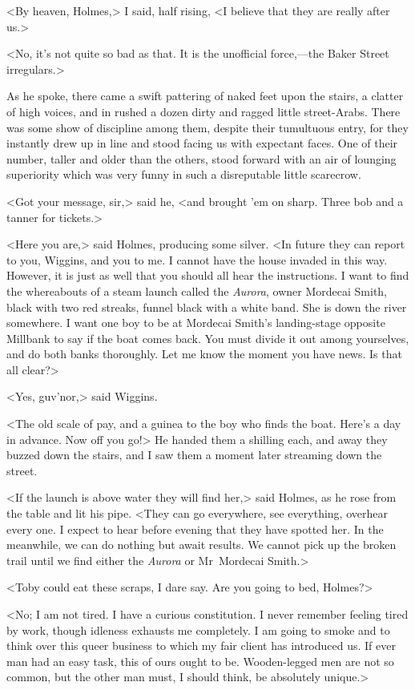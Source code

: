<By heaven, Holmes,> I said, half rising, <I believe that they are really after us.>

<No, it's not quite so bad as that. It is the unofficial force,—the Baker Street irregulars.>

As he spoke, there came a swift pattering of naked feet upon the stairs, a clatter of high voices, and in rushed a dozen dirty and ragged little street-Arabs. There was some show of discipline among them, despite their tumultuous entry, for they instantly drew up in line and stood facing us with expectant faces. One of their number, taller and older than the others, stood forward with an air of lounging superiority which was very funny in such a disreputable little scarecrow.

<Got your message, sir,> said he, <and brought 'em on sharp. Three bob and a tanner for tickets.>

<Here you are,> said Holmes, producing some silver. <In future they can report to you, Wiggins, and you to me. I cannot have the house invaded in this way. However, it is just as well that you should all hear the instructions. I want to find the whereabouts of a steam launch called the \textit{Aurora}, owner Mordecai Smith, black with two red streaks, funnel black with a white band. She is down the river somewhere. I want one boy to be at Mordecai Smith's landing-stage opposite Millbank to say if the boat comes back. You must divide it out among yourselves, and do both banks thoroughly. Let me know the moment you have news. Is that all clear?>

<Yes, guv'nor,> said Wiggins.

<The old scale of pay, and a guinea to the boy who finds the boat. Here's a day in advance. Now off you go!> He handed them a shilling each, and away they buzzed down the stairs, and I saw them a moment later streaming down the street.

<If the launch is above water they will find her,> said Holmes, as he rose from the table and lit his pipe. <They can go everywhere, see everything, overhear every one. I expect to hear before evening that they have spotted her. In the meanwhile, we can do nothing but await results. We cannot pick up the broken trail until we find either the \textit{Aurora} or Mr~Mordecai Smith.>

<Toby could eat these scraps, I dare say. Are you going to bed, Holmes?>

<No; I am not tired. I have a curious constitution. I never remember feeling tired by work, though idleness exhausts me completely. I am going to smoke and to think over this queer business to which my fair client has introduced us. If ever man had an easy task, this of ours ought to be. Wooden-legged men are not so common, but the other man must, I should think, be absolutely unique.>

